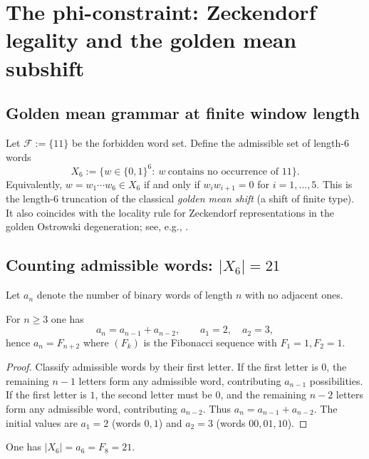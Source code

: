 
\section{The phi-constraint: Zeckendorf legality and the golden mean subshift}
\label{sec:phi_constraint}

\subsection{Golden mean grammar at finite window length}
Let $\mathcal{F}:=\{11\}$ be the forbidden word set.
Define the admissible set of length-$6$ words
\[
X_6:=\{w\in\{0,1\}^6:\ w\ \text{contains no occurrence of }11\}.
\]
Equivalently, $w=w_1\cdots w_6\in X_6$ if and only if $w_iw_{i+1}=0$ for $i=1,\dots,5$.
This is the length-$6$ truncation of the classical \emph{golden mean shift} (a shift of finite type).
It also coincides with the locality rule for Zeckendorf representations in the golden Ostrowski degeneration; see, e.g., \cite{AlloucheShallit2003,Lothaire2002,Zeckendorf1972}.

\subsection{Counting admissible words: \texorpdfstring{$|X_6|=21$}{|X6|=21}}
Let $a_n$ denote the number of binary words of length $n$ with no adjacent ones.

\begin{proposition}
\label{prop:no_adjacent_fib}
For $n\ge 3$ one has
\[
a_n=a_{n-1}+a_{n-2},
\qquad a_1=2,\quad a_2=3,
\]
hence $a_n=F_{n+2}$ where $(F_k)$ is the Fibonacci sequence with $F_1=1,F_2=1$.
\end{proposition}

\begin{proof}
Classify admissible words by their first letter.
If the first letter is $0$, the remaining $n-1$ letters form any admissible word, contributing $a_{n-1}$ possibilities.
If the first letter is $1$, the second letter must be $0$, and the remaining $n-2$ letters form any admissible word, contributing $a_{n-2}$.
Thus $a_n=a_{n-1}+a_{n-2}$.
The initial values are $a_1=2$ (words $0,1$) and $a_2=3$ (words $00,01,10$).
\end{proof}

\begin{corollary}
\label{cor:x6_21}
One has $|X_6|=a_6=F_8=21$.
\end{corollary}

